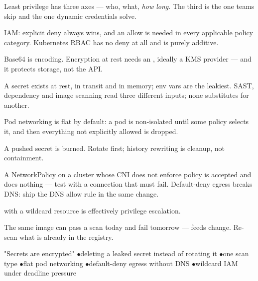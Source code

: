 
\begin{tickcheck}
  \item Least privilege has three axes --- who, what, \emph{how long}. The third is the one teams skip and the one dynamic credentials solve.
  \item IAM: explicit deny always wins, and an allow is needed in every applicable policy category. Kubernetes RBAC has no deny at all and is purely additive.
  \item Base64 is encoding. Encryption at rest needs an , ideally a KMS provider --- and it protects storage, not the API.
  \item A secret exists at rest, in transit and in memory; env vars are the leakiest. SAST, dependency and image scanning read three different inputs; none substitutes for another.
  \item Pod networking is flat by default: a pod is non-isolated until some policy selects it, and then everything not explicitly allowed is dropped.
  \item A pushed secret is burned. Rotate first; history rewriting is cleanup, not containment.
\end{tickcheck}

\begin{wbitem}
  \item A NetworkPolicy on a cluster whose CNI does not enforce policy is accepted and does nothing --- test with a connection that must fail. Default-deny egress breaks DNS: ship the DNS allow rule in the same change.
  \item {} with a wildcard resource is effectively privilege escalation.
  \item The same image can pass a scan today and fail tomorrow --- feeds change. Re-scan what is already in the registry.
\end{wbitem}

\begin{wbitem}
  \item "Secrets are encrypted" \quad$\bullet$\quad deleting a leaked secret instead of rotating it \quad$\bullet$\quad one scan type \quad$\bullet$\quad flat pod networking \quad$\bullet$\quad default-deny egress without DNS \quad$\bullet$\quad wildcard IAM under deadline pressure
\end{wbitem}

